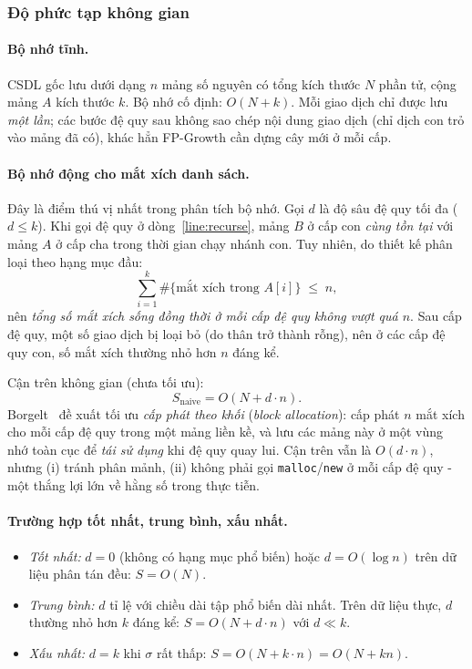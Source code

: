 \documentclass[12pt,a4paper]{report}
\begin{document}
\subsubsection*{Độ phức tạp không gian}

\paragraph{Bộ nhớ tĩnh.}
CSDL gốc lưu dưới dạng $n$ mảng số nguyên có tổng kích thước $N$ phần tử, cộng
mảng $A$ kích thước $k$. Bộ nhớ cố định: $O(N + k)$. Mỗi giao dịch chỉ được lưu
\textit{một lần}; các bước đệ quy sau không sao chép nội dung giao dịch (chỉ
dịch con trỏ vào mảng đã có), khác hẳn FP-Growth cần dựng cây mới ở mỗi cấp.

\paragraph{Bộ nhớ động cho mắt xích danh sách.}
Đây là điểm thú vị nhất trong phân tích bộ nhớ. Gọi $d$ là độ sâu đệ quy tối
đa ($d \leq k$). Khi gọi đệ quy ở dòng~\ref{line:recurse}, mảng $B$ ở cấp con
\textit{cùng tồn tại} với mảng $A$ ở cấp cha trong thời gian chạy nhánh con.
Tuy nhiên, do thiết kế phân loại theo hạng mục đầu:
\begin{equation}
    \sum_{i=1}^{k} \#\{\text{mắt xích trong } A[i]\} \;\leq\; n,
    \label{eq:lists-leq-n}
\end{equation}
nên \textit{tổng số mắt xích sống đồng thời ở mỗi cấp đệ quy không vượt quá
$n$}. Sau cấp đệ quy, một số giao dịch bị loại bỏ (do thân trở thành rỗng), nên
ở các cấp đệ quy con, số mắt xích thường nhỏ hơn $n$ đáng kể.

\noindent
Cận trên không gian (chưa tối ưu):
\begin{equation}
    S_{\text{naive}} = O(N + d \cdot n).
\end{equation}
Borgelt~\cite[Section~2.4]{borgelt2005} đề xuất tối ưu \textit{cấp phát theo
khối} (\textit{block allocation}): cấp phát $n$ mắt xích cho mỗi cấp đệ quy
trong một mảng liền kề, và lưu các mảng này ở một vùng nhớ toàn cục để
\textit{tái sử dụng} khi đệ quy quay lui. Cận trên vẫn là $O(d \cdot n)$,
nhưng (i) tránh phân mảnh, (ii) không phải gọi
\texttt{malloc}/\texttt{new} ở mỗi cấp đệ quy - một thắng lợi lớn về hằng số
trong thực tiễn.

\paragraph{Trường hợp tốt nhất, trung bình, xấu nhất.}
\begin{itemize}
    \item \textit{Tốt nhất:} $d = 0$ (không có hạng mục phổ biến) hoặc
    $d = O(\log n)$ trên dữ liệu phân tán đều: $S = O(N)$.
    \item \textit{Trung bình:} $d$ tỉ lệ với chiều dài tập phổ biến dài nhất.
    Trên dữ liệu thực, $d$ thường nhỏ hơn $k$ đáng kể: $S = O(N + d\cdot n)$
    với $d \ll k$.
    \item \textit{Xấu nhất:} $d = k$ khi $\sigma$ rất thấp:
    $S = O(N + k \cdot n) = O(N + kn)$.
\end{itemize}
\end{document}
